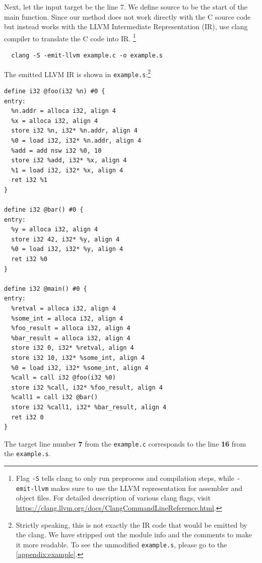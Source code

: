 \documentclass[12pt, twoside]{fithesis2}
\renewcommand{\_}{\leavevmode \kern0.07em\vbox{\hrule width0.4em}}
\begin{document}
Next, let the input target be the line 7.
We define source to be the start of the main function.
Since our method does not work directly with the C source code but instead
works with the LLVM Intermediate Representation (IR), use clang compiler to
translate the C code into IR.
\footnote {
Flag \texttt{-S} tells clang to only run preprocess and
compilation steps, while \texttt{-emit-llvm} makes sure to use the LLVM
representation for assembler and object files. For detailed description of
various clang flags, visit
\url{https://clang.llvm.org/docs/ClangCommandLineReference.html}.
}

\begin{verbatim}
  clang -S -emit-llvm example.c -o example.s
\end{verbatim}

The emitted LLVM IR is shown in \texttt{example.s}:\footnote{
Strictly speaking, this is not exactly the IR code that would be emitted by the
clang. We have stripped out the module info and the comments to make it more
readable. To see the unmodified \texttt{example.s}, please go to the
\autoref{appendix:example}.
}

\begin{verbatim}
define i32 @foo(i32 %n) #0 {
entry:
  %n.addr = alloca i32, align 4
  %x = alloca i32, align 4
  store i32 %n, i32* %n.addr, align 4
  %0 = load i32, i32* %n.addr, align 4
  %add = add nsw i32 %0, 10
  store i32 %add, i32* %x, align 4
  %1 = load i32, i32* %x, align 4
  ret i32 %1
}

define i32 @bar() #0 {
entry:
  %y = alloca i32, align 4
  store i32 42, i32* %y, align 4
  %0 = load i32, i32* %y, align 4
  ret i32 %0
}

define i32 @main() #0 {
entry:
  %retval = alloca i32, align 4
  %some_int = alloca i32, align 4
  %foo_result = alloca i32, align 4
  %bar_result = alloca i32, align 4
  store i32 0, i32* %retval, align 4
  store i32 10, i32* %some_int, align 4
  %0 = load i32, i32* %some_int, align 4
  %call = call i32 @foo(i32 %0)
  store i32 %call, i32* %foo_result, align 4
  %call1 = call i32 @bar()
  store i32 %call1, i32* %bar_result, align 4
  ret i32 0
}
\end{verbatim}

The target line number \textbf{7} from the \texttt{example.c}
corresponds to the line \textbf{16} from the \texttt{example.s}.
\end{document}
